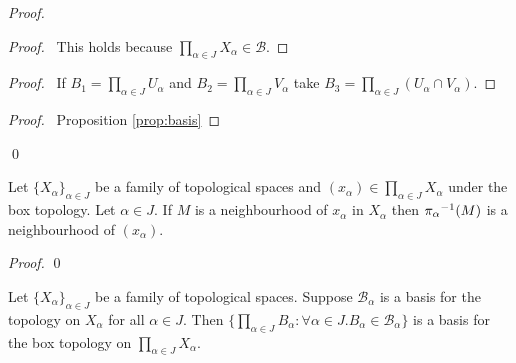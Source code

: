 \begin{proof}
  \pf
  \begin{proof}
    \pf\ This holds because $\prod_{\alpha \in J} X_\alpha \in \mathcal{B}$.
  \end{proof}
  \begin{proof}
    \pf\ If $B_1 = \prod_{\alpha \in J} U_\alpha$ and $B_2 = \prod_{\alpha \in J} V_\alpha$ take $B_3 = \prod_{\alpha \in J} (U_\alpha \cap V_\alpha)$.
  \end{proof}
  \qedstep
  \begin{proof}
    \pf\ Proposition \ref{prop:basis}
  \end{proof}
  \qed
\end{proof}

\begin{prop}
  \label{prop:box:neighbourhood}
  Let $\{ X_\alpha \}_{\alpha \in J}$ be a family of topological spaces and $(x_\alpha) \in \prod_{\alpha \in J} X_\alpha$ under the box topology. Let $\alpha \in J$. If $M$ is a neighbourhood of $x_\alpha$ in $X_\alpha$ then ${\pi_\alpha}^{-1}(M)$ is a neighbourhood of $(x_\alpha)$.
\end{prop}

\begin{proof}
  \pf
  \qed
\end{proof}

\begin{prop}[AC]
  Let $\{ X_\alpha \}_{\alpha \in J}$ be a family of topological spaces. Suppose $\mathcal{B}_\alpha$ is a basis for the topology on $X_\alpha$ for all $\alpha \in J$. Then $\{ \prod_{\alpha \in J} B_\alpha : \forall \alpha \in J. B_\alpha \in \mathcal{B}_\alpha \}$ is a basis for the box topology on $\prod_{\alpha \in J} X_\alpha$.
\end{prop}

